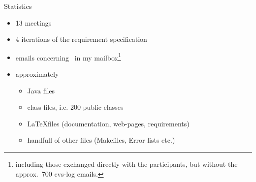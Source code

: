 \begin{myslide}{Statistics}
  \begin{itemize}
  \item 13 meetings
  \item 4 iterations of the requirement specification
  \item {} emails concerning \Slime\ in my
    mailbox\footnote{including those exchanged directly with the
      participants, but without the approx.\ 700 cvs-log emails.}
  \item approximately
    \begin{itemize}
    \item {} Java files
    \item {} class files, i.e. 200 public classes
    \item {}  \LaTeX files (documentation, web-pages, requirements)
    \item handfull of other files (Makefiles, Error lists etc.)
    \end{itemize}
  \end{itemize}
  
\end{myslide}






